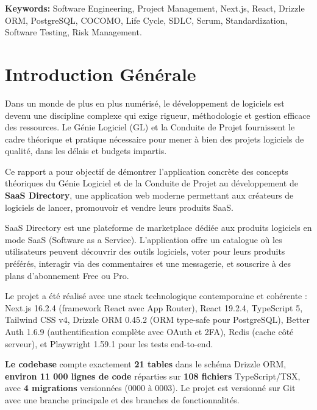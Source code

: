 \documentclass[12pt,a4paper]{article}
\begin{document}
\vspace{0.5cm}
\noindent\textbf{Keywords:} Software Engineering, Project Management, Next.js, React, Drizzle ORM, PostgreSQL, COCOMO, Life Cycle, SDLC, Scrum, Standardization, Software Testing, Risk Management.
\newpage

\tableofcontents
\newpage
\listoffigures
\newpage
\listoftables
\newpage

\section*{Introduction Générale}

Dans un monde de plus en plus numérisé, le développement de logiciels est devenu une discipline complexe qui exige rigueur, méthodologie et gestion efficace des ressources. Le Génie Logiciel (GL) et la Conduite de Projet fournissent le cadre théorique et pratique nécessaire pour mener à bien des projets logiciels de qualité, dans les délais et budgets impartis.

Ce rapport a pour objectif de démontrer l'application concrète des concepts théoriques du Génie Logiciel et de la Conduite de Projet au développement de \textbf{SaaS Directory}, une application web moderne permettant aux créateurs de logiciels de lancer, promouvoir et vendre leurs produits SaaS.

SaaS Directory est une plateforme de marketplace dédiée aux produits logiciels en mode SaaS (Software as a Service). L'application offre un catalogue où les utilisateurs peuvent découvrir des outils logiciels, voter pour leurs produits préférés, interagir via des commentaires et une messagerie, et souscrire à des plans d'abonnement Free ou Pro.

Le projet a été réalisé avec une stack technologique contemporaine et cohérente : Next.js 16.2.4 (framework React avec App Router), React 19.2.4, TypeScript 5, Tailwind CSS v4, Drizzle ORM 0.45.2 (ORM type-safe pour PostgreSQL), Better Auth 1.6.9 (authentification complète avec OAuth et 2FA), Redis (cache côté serveur), et Playwright 1.59.1 pour les tests end-to-end.

\textbf{Le codebase} compte exactement \textbf{21 tables} dans le schéma Drizzle ORM, \textbf{environ 11 000 lignes de code} réparties sur \textbf{108 fichiers} TypeScript/TSX, avec \textbf{4 migrations} versionnées (0000 à 0003). Le projet est versionné sur Git avec une branche principale et des branches de fonctionnalités.
\end{document}
